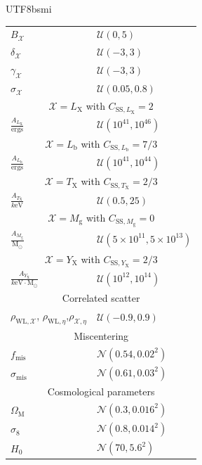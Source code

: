 \documentclass[longauth]{aa}
\newcommand{\OmegaM}{\ensuremath{\Omega_{\mathrm{M}}}}
\newcommand{\Hnow}{\ensuremath{H_{0}}}
\newcommand{\sigmaeight}{\ensuremath{\sigma_{8}}}
\newcommand{\Msun}{\ensuremath{\mathrm{M}_{\odot}}}
\newcommand{\Xlabel}{\ensuremath{\mathcal{X}}}
\newcommand{\fmis}{\ensuremath{f_{\mathrm{mis}}}}
\newcommand{\sigmamis}{\ensuremath{{\sigma}_{\mathrm{mis}}}}
\newcommand{\Lx}{\ensuremath{L_{\mathrm{X}}}}
\newcommand{\Lb}{\ensuremath{L_{\mathrm{b}}}}
\newcommand{\Tx}{\ensuremath{T_{\mathrm{X}}}}
\newcommand{\Yx}{\ensuremath{Y_{\mathrm{X}}}}
\newcommand{\Mg}{\ensuremath{M_{\mathrm{g}}}}
\newcommand{\rate}{\ensuremath{\eta}}
\begin{document}
\begin{CJK*}{UTF8}{bsmi}
\begin{table}
{\begin{tabular}{ll}
\hline
$B_{\Xlabel}$               &$\mathcal{U}(0,5)$  \\[3pt]
$\delta_{\Xlabel}$        &$\mathcal{U}(-3,3)$  \\[3pt]
$\gamma_{\Xlabel}$    &$\mathcal{U}(-3,3)$  \\[3pt]
$\sigma_{\Xlabel}$      &$\mathcal{U}(0.05, 0.8)$ \\[3pt]
\hline
\multicolumn{2}{c}{$\Xlabel = \Lx$ with $C_{\mathrm{SS},\Lx} = 2$}\\[3pt]
$\frac{A_{\Lx}}{\mathrm{ergs}}$             &$\mathcal{U}(10^{41},10^{46})$ \\[3pt]
\hline
\multicolumn{2}{c}{$\Xlabel = \Lb$ with $C_{\mathrm{SS},\Lb} = 7/3$}\\[3pt]
$\frac{A_{\Lb}}{\mathrm{ergs}}$             &$\mathcal{U}(10^{41},10^{44})$  \\[3pt]
\hline
\multicolumn{2}{c}{$\Xlabel = \Tx$ with $C_{\mathrm{SS},\Tx} = 2/3$}\\[3pt]
$\frac{A_{\Tx}}{k\mathrm{eV}}$            &$\mathcal{U}(0.5,25)$  \\[3pt]
\hline
\multicolumn{2}{c}{$\Xlabel = \Mg$ with $C_{\mathrm{SS},\Mg} = 0$} \\[3pt]
$\frac{A_{\Mg}}{\Msun}$            &$\mathcal{U}(5\times10^{11},5\times10^{13})$  \\[3pt]
\hline
\multicolumn{2}{c}{$\Xlabel = \Yx$ with $C_{\mathrm{SS},\Yx} = 2/3$}\\[3pt]
$\frac{A_{\Yx}}{k\mathrm{eV}\cdot\Msun}$            &$\mathcal{U}(10^{12},10^{14})$  \\[3pt]
\hline
\multicolumn{2}{c}{Correlated scatter} \\
\hline
$\rho_{\mathrm{WL},\mathcal{X}}$, $\rho_{\mathrm{WL},\rate}$,$\rho_{\mathcal{X},\rate}$ & $\mathcal{U}(-0.9,0.9)$ \\[3pt]
\hline
\multicolumn{2}{c}{Miscentering} \\
\hline
\fmis         &$\mathcal{N}(0.54,0.02^2)$  \\[3pt]
\sigmamis &$\mathcal{N}(0.61,0.03^2)$  \\[3pt]
\hline
\multicolumn{2}{c}{Cosmological parameters} \\
\hline
\OmegaM     &$\mathcal{N}(0.3,0.016^2)$  \\[3pt]
\sigmaeight &$\mathcal{N}(0.8,0.014^2)$   \\[3pt]
\Hnow         &$\mathcal{N}(70,5.6^2)$        \\[3pt]
\hline\hline
\end{tabular}
}
\end{table}
%



\end{CJK*}
\end{document}
